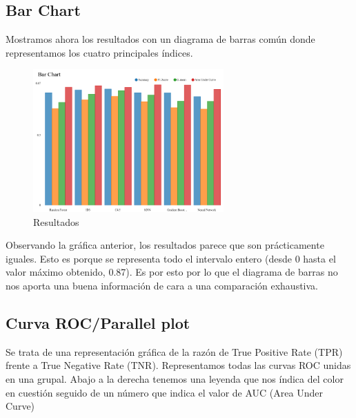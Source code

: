 	
	\subsection{Bar Chart}
	
	\hspace{1cm} Mostramos ahora los resultados con un diagrama de barras común donde representamos los cuatro principales índices.
	
	\begin{figure}[H]
		\centering
		\includegraphics[width=0.65\textwidth]{img/h1.png}
		\caption{Resultados}
	\end{figure}
	
	Observando la gráfica anterior, los resultados parece que son prácticamente iguales. Esto es porque se representa todo el intervalo entero (desde 0 hasta el valor máximo obtenido, 0.87). Es por esto por lo que el diagrama de barras no nos aporta una buena información de cara a una comparación exhaustiva.


	\subsection{Curva ROC/Parallel plot}
	
	\hspace{1cm} Se trata de una representación gráfica de la razón de True Positive Rate (TPR) frente a True Negative Rate (TNR). Representamos todas las curvas ROC unidas en una grupal. Abajo a la derecha tenemos una leyenda que nos índica del color en cuestión seguido de un número que indica el valor de AUC (Area Under Curve)
	
